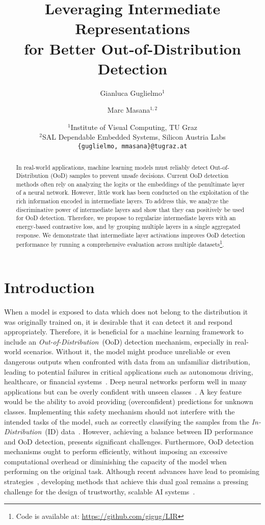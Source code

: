\documentclass[10pt,twocolumn,a4paper]{article}
\title{Leveraging Intermediate Representations\\ for Better Out-of-Distribution Detection}
\author{Gianluca Guglielmo$^{1}$\and 
Marc Masana$^{1,2}$\vspace{0.2em}\and
{$^{1}$Institute of Visual Computing, TU Graz}\\
{$^{2}$SAL Dependable Embedded Systems, Silicon Austria Labs}\\
{\tt\small \{guglielmo, mmasana\}@tugraz.at}
}
\begin{document}
\maketitle

\begin{abstract}
In real-world applications, machine learning models must reliably detect Out-of-Distribution (OoD) samples to prevent unsafe decisions. Current OoD detection methods often rely on analyzing the logits or the embeddings of the penultimate layer of a neural network. However, little work has been conducted on the exploitation of the rich information encoded in intermediate layers. To address this, we analyze the discriminative power of intermediate layers and show that they can positively be used for OoD detection. Therefore, we propose to regularize intermediate layers with an energy-based contrastive loss, and by grouping multiple layers in a single aggregated response. We demonstrate that intermediate layer activations improves OoD detection performance by running a comprehensive evaluation across multiple datasets\footnote{Code is available at:  \url{https://github.com/gigug/LIR}}.
\end{abstract}

\section{Introduction}\label{sec:intro}
When a model is exposed to data which does not belong to the distribution it was originally trained on, it is desirable that it can detect it and respond appropriately. Therefore, it is beneficial for a machine learning framework to include an \textit{Out-of-Distribution}~(OoD) detection mechanism, especially in real-world scenarios. Without it, the model might produce unreliable or even dangerous outputs when confronted with data from an unfamiliar distribution, leading to potential failures in critical applications such as autonomous driving, healthcare, or financial systems~\cite{amodei2016concrete, yang2024generalized}. Deep neural networks perform well in many applications but can be overly confident with unseen classes~\cite{nguyen2015deep}. A key feature would be the ability to avoid providing (overconfident) predictions for unknown classes. Implementing this safety mechanism should not interfere with the intended tasks of the model, such as correctly classifying the samples from the \textit{In-Distribution}~(ID) data~\cite{yang2024generalized}. However, achieving a balance between ID performance and OoD detection, presents significant challenges. Furthermore, OoD detection mechanisms ought to perform efficiently, without imposing an excessive computational overhead or diminishing the capacity of the model when performing on the original task. Although recent advances have lead to promising strategies~\cite{lu2024recent, liu2021towards, yang2024generalized}, developing methods that achieve this dual goal remains a pressing challenge for the design of trustworthy, scalable AI systems~\cite{diaz2023connecting}.
\end{document}
